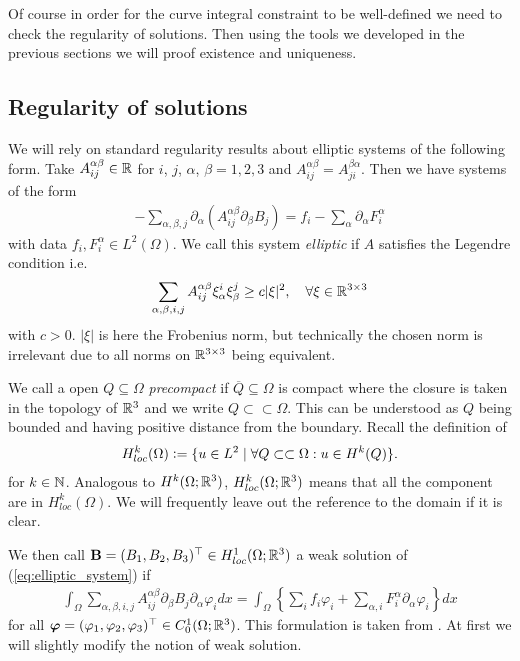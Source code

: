 \documentclass[../master_thesis.tex]{subfiles}
\begin{document}
Of course in order for the curve integral constraint to be well-defined 
we need to check the regularity of solutions. Then using the tools we developed
in the previous sections we will proof existence and uniqueness.

\subsection{Regularity of solutions}\label{sec:regularity_of_solutions}

We will rely on standard regularity results about elliptic systems 
of the following form. Take $A_{ij}^{\alpha \beta} \in \mathbb{R}$
for $i$, $j$, $\alpha$, $\beta = 1,2,3$ and 
$A_{ij}^{\alpha \beta} = A_{ji}^{\beta \alpha}$. Then we have systems of the 
form 
\begin{align}
    -\sum\limits_{\alpha, \beta, j} \partial_\alpha 
        (A_{ij}^{\alpha \beta} \partial_\beta B_j)
    = f_i - \sum\limits_\alpha \partial_\alpha F_i^\alpha
    \label{eq:elliptic_system}
\end{align}
with data $f_i, F_i^\alpha \in L^2(\Omega)$. We call this system 
\textit{elliptic} if $A$ satisfies the Legendre condition i.e.
\begin{align}
    \sum_{\alpha,\beta,i,j}A_{ij}^{\alpha \beta} \xi_\alpha^i \xi_\beta^j
    \geq c |\xi|^2, \quad \forall \xi \in \mathbb{R}^{3 \times 3} 
    \label{eq:legendre_condition}
\end{align}
with $c > 0$. $|\xi|$ is here the Frobenius norm, but technically the chosen 
norm is irrelevant due to all norms on $\mathbb{R}^{3 \times 3}$ being equivalent.

We call a open $Q \subseteq \Omega$ \textit{precompact} if 
$\overline{Q} \subseteq \Omega$ is compact where the closure is taken in the topology of $\mathbb{R}^3$
and we write $Q \subset\subset \Omega$. This can be understood as 
$Q$ being bounded and having positive distance from the boundary.
Recall the definition of 
\begin{align*}
    H^k_{loc}(\Omega) \vcentcolon= \{ u\in L^2 
        \mid \forall Q\subset\subset \Omega: u \in H^k(Q) \}.
\end{align*}
for $k \in \mathbb{N}$.
Analogous to $H^k(\Omega;\mathbb{R}^3)$, $H^k_{loc}(\Omega;\mathbb{R}^3)$ means that 
all the component are in $H^k_{loc}(\Omega)$. We will frequently leave out the 
reference to the domain if it is clear.

We then call $\mathbf{B} = (B_1, B_2, B_3)^\top \in H^1_{loc}(\Omega;\mathbb{R}^3)$ a weak solution
of (\ref{eq:elliptic_system}) if 
\begin{align}
    \int_\Omega \sum\limits_{\alpha,\beta,i,j} 
        A_{ij}^{\alpha \beta} \partial_\beta B_j \partial_\alpha \varphi_i dx
    = \int_\Omega \left\{ \sum\limits_i f_i \varphi_i + 
        \sum\limits_{\alpha,i} F_i^\alpha \partial_\alpha \varphi_i \right\} dx
    \label{eq:weak_elliptic_system}
\end{align}
for all $\bm{\varphi} = (\varphi_1, \varphi_2, \varphi_3)^\top \in C^1_0(\Omega;\mathbb{R}^3)$. 
This formulation is taken from 
\cite[Sec. 1.3]{lectures_on_elliptic_pdes}. At first we will slightly modify
the notion of weak solution. 
\end{document}
